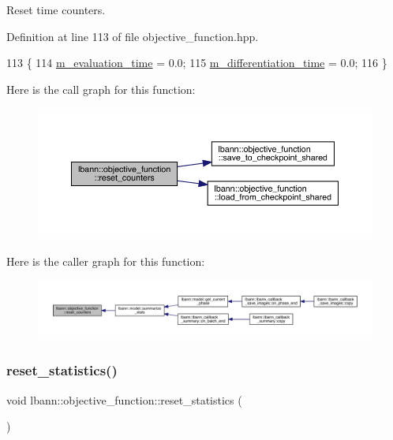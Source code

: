 Reset time counters. 

Definition at line 113 of file objective\+\_\+function.\+hpp.


\begin{DoxyCode}
113                         \{
114     \hyperlink{classlbann_1_1objective__function_a9ef17c7204cd371261c9c083d86de91a}{m\_evaluation\_time} = 0.0;
115     \hyperlink{classlbann_1_1objective__function_ae526559f3a530f540a29407ea64bbea6}{m\_differentiation\_time} = 0.0;
116   \}
\end{DoxyCode}
Here is the call graph for this function\+:\nopagebreak
\begin{figure}[H]
\begin{center}
\leavevmode
\includegraphics[width=350pt]{classlbann_1_1objective__function_a92b248be17049b1d7e82accbd913d6f1_cgraph}
\end{center}
\end{figure}
Here is the caller graph for this function\+:\nopagebreak
\begin{figure}[H]
\begin{center}
\leavevmode
\includegraphics[width=350pt]{classlbann_1_1objective__function_a92b248be17049b1d7e82accbd913d6f1_icgraph}
\end{center}
\end{figure}
\mbox{\label{classlbann_1_1objective__function_acf7a6c67e7a45a1fd03684ca897d6324}} 
\subsubsection{\texorpdfstring{reset\+\_\+statistics()}{reset\_statistics()}\hspace{0.1cm}{\footnotesize\ttfamily [1/2]}}
{\footnotesize\ttfamily void lbann\+::objective\+\_\+function\+::reset\+\_\+statistics (\begin{DoxyParamCaption}{ }\end{DoxyParamCaption})\hspace{0.3cm}{\ttfamily [inline]}}

